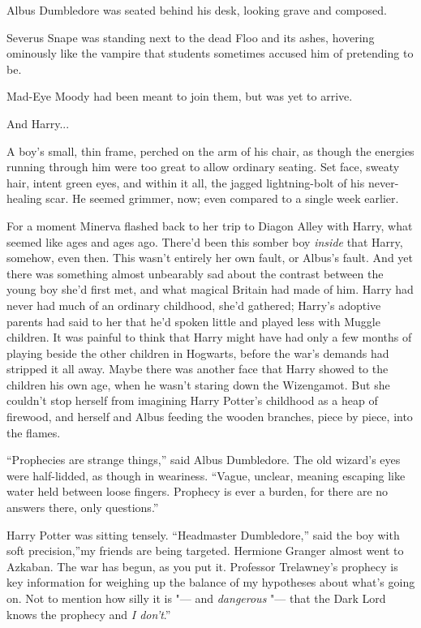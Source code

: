 Albus Dumbledore was seated behind his desk, looking grave and composed.

Severus Snape was standing next to the dead Floo and its ashes, hovering
ominously like the vampire that students sometimes accused him of
pretending to be.

Mad-Eye Moody had been meant to join them, but was yet to arrive.

And Harry...

A boy's small, thin frame, perched on the arm of his chair, as though
the energies running through him were too great to allow ordinary
seating. Set face, sweaty hair, intent green eyes, and within it all,
the jagged lightning-bolt of his never-healing scar. He seemed grimmer,
now; even compared to a single week earlier.

For a moment Minerva flashed back to her trip to Diagon Alley with
Harry, what seemed like ages and ages ago. There'd been this somber boy
\emph{inside} that Harry, somehow, even then. This wasn't entirely her
own fault, or Albus's fault. And yet there was something almost
unbearably sad about the contrast between the young boy she'd first met,
and what magical Britain had made of him. Harry had never had much of an
ordinary childhood, she'd gathered; Harry's adoptive parents had said to
her that he'd spoken little and played less with Muggle children. It was
painful to think that Harry might have had only a few months of playing
beside the other children in Hogwarts, before the war's demands had
stripped it all away. Maybe there was another face that Harry showed to
the children his own age, when he wasn't staring down the Wizengamot.
But she couldn't stop herself from imagining Harry Potter's childhood as
a heap of firewood, and herself and Albus feeding the wooden branches,
piece by piece, into the flames.

``Prophecies are strange things,'' said Albus Dumbledore. The old
wizard's eyes were half-lidded, as though in weariness. ``Vague,
unclear, meaning escaping like water held between loose fingers.
Prophecy is ever a burden, for there are no answers there, only
questions.''

Harry Potter was sitting tensely. ``Headmaster Dumbledore,'' said the
boy with soft precision,''my friends are being targeted. Hermione
Granger almost went to Azkaban. The war has begun, as you put it.
Professor Trelawney's prophecy is key information for weighing up the
balance of my hypotheses about what's going on. Not to mention how silly
it is "--- and \emph{dangerous} "--- that the Dark Lord knows the prophecy and
\emph{I don't}.''

